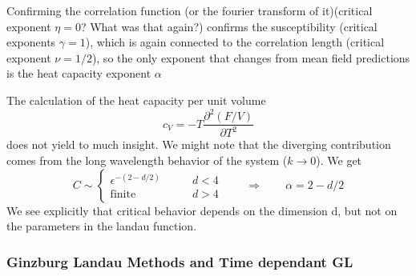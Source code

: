 	Confirming the correlation function (or the fourier transform of it)(critical exponent $\eta =	0$? What was that again?) confirms the susceptibility (critical exponents $\gamma =	1$), which is again connected to the correlation length (critical exponent $\nu =	1/2$), so the only exponent that changes from mean field predictions is the heat capacity exponent $\alpha$
	
	The calculation of the heat capacity per unit volume
	\begin{equation}
		c_V =	- T	\frac{\partial^2 (F/V)}{\partial T^2}
	\end{equation}
	does not yield to much insight. We might note that the diverging contribution comes from the long wavelength behavior of the system ($k \rightarrow 0$). We get
	\begin{equation}
		C \sim \begin{cases}
			\epsilon^{-(2 - d/2)} \qquad &d < 4 \\
			\text{finite} \qquad 	&d > 4
		\end{cases} \qquad \Rightarrow \qquad \alpha =	2 - d/2
	\end{equation}
	We see explicitly that critical behavior depends on the dimension d, but not on the parameters in the landau function.
	\subsubsection{Ginzburg Landau Methods and Time dependant GL}
